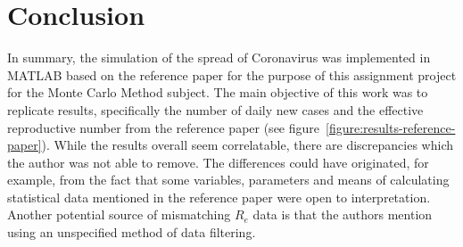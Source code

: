 \documentclass[a4paper]{article}
\begin{document}
\section{Conclusion}\label{section:conclusion}
In summary, the simulation of the spread of Coronavirus was implemented in MATLAB based on the reference paper \cite{Maltezos2021} for the purpose of this assignment project for the Monte Carlo Method subject. The main objective of this work was to replicate results, specifically the number of daily new cases and the effective reproductive number from the reference paper \cite{Maltezos2021} (see figure~\ref{figure:results-reference-paper}). While the results overall seem correlatable, there are discrepancies which the author was not able to remove. The differences could have originated, for example, from the fact that some variables, parameters and means of calculating statistical data mentioned in the reference paper \cite{Maltezos2021} were open to interpretation. Another potential source of mismatching $R_e$ data is that the authors mention using an unspecified method of data filtering.





 
\end{document}
